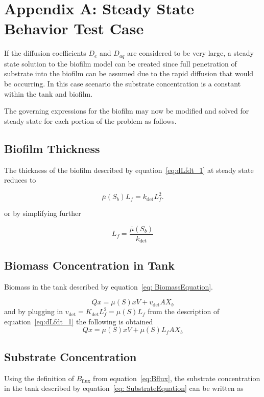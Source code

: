 \documentclass[letterpaper, twoside]{article}
\numberwithin{equation}{section}
\begin{document}
\section{Appendix A: Steady State Behavior Test Case}\label{Steady State}

If the diffusion coefficients $D_e$ and $D_{aq}$ are considered to be very large, a steady state solution to the biofilm model can be created since full penetration of substrate into the biofilm can be assumed due to the rapid diffusion that would be occurring. In this case scenario the substrate concentration is a constant within the tank and biofilm.

The governing expressions for the biofilm may now be modified and solved for steady state for each portion of the problem as follows.

\subsection{Biofilm Thickness}
The thickness of the biofilm described by equation~\ref{eq:dLfdt_1} at steady state reduces to 

\begin{equation*}
   {\bar\mu(S_b) L_f}={k_{\mathrm{det}}L_f^2}.
\end{equation*}
 
 or by simplifying further
 
 \begin{equation}
  \label{eq:Lfsteady}
  {L_f}=\frac{\bar\mu(S_b)}{k_{\mathrm{det}}}
\end{equation}

\subsection{Biomass Concentration in Tank}
Biomass in the tank described by equation~\ref{eq: BiomassEquation}. 

\begin{equation*} 
  Qx = \mu(S) xV +v_{\mathrm{det}} A X_b
\end{equation*}
and by plugging in $v_{\mathrm{det}}= K_\mathrm{det} L_f^2 = \mu(S) L_f$ from the description of equation~\ref{eq:dLfdt_1} the following is obtained
\begin{equation}
 \label{eq:biomass steady}
  Qx = \mu(S) xV +\mu(S) L_f A X_b
\end{equation}

\subsection{Substrate Concentration}
Using the definition of $B_{\mathrm{flux}}$ from equation~\ref{eq:Bflux}, the substrate concentration in the tank described by equation~\ref{eq: SubstrateEquation} can be written as
\end{document}
